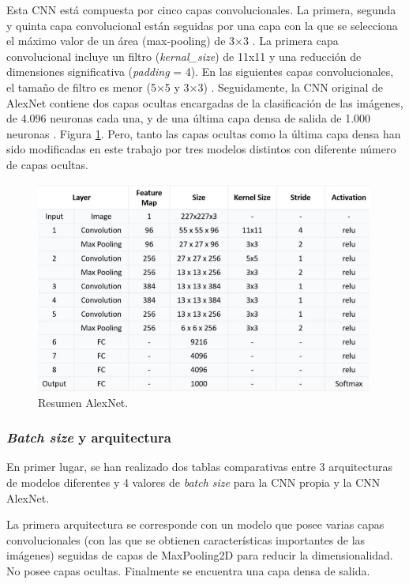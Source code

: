 Esta CNN está compuesta por cinco capas convolucionales. La primera, segunda y quinta capa convolucional están seguidas por una capa con la que se selecciona el máximo valor de un área (max-pooling) de 3×3 \cite{LMO24}. La primera capa convolucional incluye un filtro (\textit{kernal\_size})  de 11x11 y una reducción de dimensiones significativa (\textit{padding} = 4). En las siguientes capas convolucionales, el tamaño de filtro es menor (5×5 y 3×3) \cite{diego23}. Seguidamente, la CNN original de AlexNet contiene dos capas ocultas encargadas de la clasificación de las imágenes, de 4.096 neuronas cada una, y de una última capa densa de salida de 1.000 neuronas \cite{LMO24}. Figura \ref{fig:resumen_alexNet}. Pero, tanto las capas ocultas como la última capa densa han sido modificadas en este trabajo por tres modelos distintos con diferente número de capas ocultas.

\begin{figure}[h]
    \centering
    \includegraphics[width=0.99\textwidth]{img/resumen_alexNet.PNG}
    \caption{Resumen AlexNet. \cite{Medium24}}
    \label{fig:resumen_alexNet}
\end{figure}

\subsubsection{\textit{Batch size} y arquitectura}
En primer lugar, se han realizado dos tablas comparativas entre 3 arquitecturas de modelos diferentes y 4 valores de \textit{batch size} para la CNN propia y la CNN AlexNet.

La primera arquitectura se corresponde con un modelo que posee varias capas convolucionales (con las que se obtienen características importantes de las imágenes) seguidas de capas de MaxPooling2D para reducir la dimensionalidad. No posee capas ocultas. Finalmente se encuentra una capa densa de salida. 

